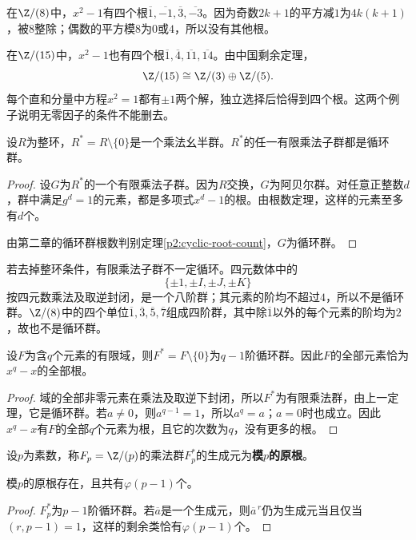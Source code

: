 \begin{example}
在$\Z/(8)$中，$x^2-1$有四个根$\overline1,\overline{-1},\overline3,\overline{-3}$。因为奇数$2k+1$的平方减$1$为$4k(k+1)$，被$8$整除；偶数的平方模$8$为$0$或$4$，所以没有其他根。

在$\Z/(15)$中，$x^2-1$也有四个根$\overline1,\overline4,\overline{11},\overline{14}$。由中国剩余定理，
\[
\Z/(15)\cong\Z/(3)\oplus\Z/(5).
\]
每个直和分量中方程$x^2=1$都有$\pm1$两个解，独立选择后恰得到四个根。这两个例子说明无零因子的条件不能删去。
\end{example}

\begin{theorem}\label{p2:finite-multiplicative-subgroup}
设$R$为整环，$R^*=R\setminus\{0\}$是一个乘法幺半群。$R^*$的任一有限乘法子群都是循环群。
\end{theorem}
\begin{proof}
设$G$为$R^*$的一个有限乘法子群。因为$R$交换，$G$为阿贝尔群。对任意正整数$d$，群中满足$g^d=1$的元素，都是多项式$x^d-1$的根。由根数定理，这样的元素至多有$d$个。

由第二章的循环群根数判别定理\ref{p2:cyclic-root-count}，$G$为循环群。
\end{proof}

\begin{example}
若去掉整环条件，有限乘法子群不一定循环。四元数体中的
\[
\{\pm1,\pm I,\pm J,\pm K\}
\]
按四元数乘法及取逆封闭，是一个八阶群；其元素的阶均不超过$4$，所以不是循环群。$\Z/(8)$中的四个单位$\overline1,\overline3,\overline5,\overline7$组成四阶群，其中除$\overline1$以外的每个元素的阶均为$2$，故也不是循环群。
\end{example}

\begin{corollary}
设$F$为含$q$个元素的有限域，则$F^*=F\setminus\{0\}$为$q-1$阶循环群。因此$F$的全部元素恰为$x^q-x$的全部根。
\end{corollary}
\begin{proof}
域的全部非零元素在乘法及取逆下封闭，所以$F^*$为有限乘法群，由上一定理，它是循环群。若$a\ne0$，则$a^{q-1}=1$，所以$a^q=a$；$a=0$时也成立。因此$x^q-x$有$F$的全部$q$个元素为根，且它的次数为$q$，没有更多的根。
\end{proof}

\begin{definition}
设$p$为素数，称$F_p=\Z/(p)$的乘法群$F_p^*$的生成元为\textbf{模$p$的原根}。
\end{definition}

\begin{corollary}
模$p$的原根存在，且共有$\varphi(p-1)$个。
\end{corollary}
\begin{proof}
$F_p^*$为$p-1$阶循环群。若$\overline a$是一个生成元，则$\overline a^{\,r}$仍为生成元当且仅当$(r,p-1)=1$，这样的剩余类恰有$\varphi(p-1)$个。
\end{proof}

